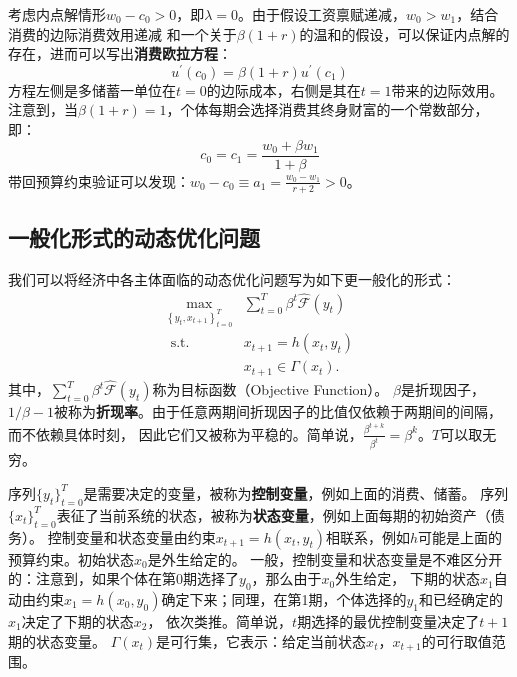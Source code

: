 考虑内点解情形$w_0-c_0>0$，即$\lambda=0$。由于假设工资禀赋递减，$w_0>w_1$，结合消费的边际消费效用递减
和一个关于$\beta(1+r)$的温和的假设，可以保证内点解的存在，进而可以写出\textbf{消费欧拉方程}：
\begin{equation*}
    u^{\prime}\left(c_0\right)=\beta(1+r) u^{\prime}\left(c_1\right)
\end{equation*}
方程左侧是多储蓄一单位在$t=0$的边际成本，右侧是其在$t=1$带来的边际效用。
注意到，当$\beta(1+r)=1$，个体每期会选择消费其终身财富的一个常数部分，即：
\begin{equation*}
    c_0=c_1=\frac{w_0+\beta w_1}{1+\beta}
\end{equation*}
带回预算约束验证可以发现：$w_0-c_0\equiv a_1 = \frac{w_0-w_1}{r+2}>0$。


\subsection{一般化形式的动态优化问题}

我们可以将经济中各主体面临的动态优化问题写为如下更一般化的形式：
\begin{equation}
    \begin{aligned}
        \max _{\left\{y_t, x_{t+1}\right\}_{t=0}^T} & \sum_{t=0}^T \beta^t \hat{\mathcal{F}}\left(y_t\right) \\
        \text { s.t. } & x_{t+1}=h\left(x_t, y_t\right) \\
        & x_{t+1} \in \Gamma\left(x_t\right) .
    \end{aligned}
    \tag{P2} \label{problem-general-dynamic-opt}
\end{equation}
其中，$\sum_{t=0}^T \beta^t \hat{\mathcal{F}}\left(y_t\right)$称为目标函数（Objective Function）。
$\beta$是折现因子，$1/\beta - 1$被称为\textbf{折现率}。由于任意两期间折现因子的比值仅依赖于两期间的间隔，而不依赖具体时刻，
因此它们又被称为平稳的。简单说，$\frac{\beta^{t+k}}{\beta^t}=\beta^k$。$T$可以取无穷。

序列$\{y_t\}_{t=0}^T$是需要决定的变量，被称为\textbf{控制变量}，例如上面的消费、储蓄。
序列$\{x_t\}_{t=0}^T$表征了当前系统的状态，被称为\textbf{状态变量}，例如上面每期的初始资产（债务）。
控制变量和状态变量由约束$x_{t+1}=h(x_t,y_t)$相联系，例如$h$可能是上面的预算约束。初始状态$x_0$是外生给定的。
一般，控制变量和状态变量是不难区分开的：注意到，如果个体在第0期选择了$y_0$，那么由于$x_0$外生给定，
下期的状态$x_1$自动由约束$x_1=h(x_0,y_0)$确定下来；同理，在第1期，个体选择的$y_1$和已经确定的$x_1$决定了下期的状态$x_2$，
依次类推。简单说，$t$期选择的最优控制变量决定了$t+1$期的状态变量。
$\Gamma\left(x_t\right)$是可行集，它表示：给定当前状态$x_t$，$x_{t+1}$的可行取值范围。

